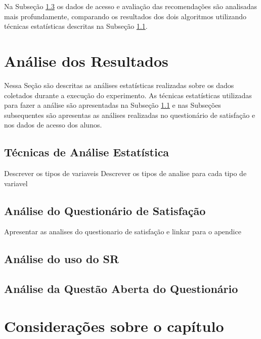 Na Subseção \ref{subsection:analise-uso-sr} os dados de acesso e avaliação das recomendações são analisadas mais profundamente,
comparando os resultados dos dois algoritmos utilizando técnicas estatísticas descritas na Subseção \ref{section:tecnicas-analise-estatistica}.

\section{Análise dos Resultados}\label{section:analise-experimento}

Nessa Seção são descritas as análises estatísticas realizadas sobre os dados coletados durante a execução do experimento.
As técnicas estatísticas utilizadas para fazer a análise são apresentadas na Subseção \ref{section:tecnicas-analise-estatistica}
e nas Subseções subsequentes são apresentas as análises realizadas no questionário de satisfação e nos dados de acesso
dos alunos.

\subsection{Técnicas de Análise Estatística}\label{section:tecnicas-analise-estatistica}

Descrever os tipos de variaveis
Descrever os tipos de analise para cada tipo de variavel


\subsection{Análise do Questionário de Satisfação}\label{subsection:analise-questionario-satisfacao}

Apresentar as analises do questionario de satisfação e linkar para o apendice

\subsection{Análise do uso do SR}\label{subsection:analise-uso-sr}

\subsection{Análise da Questão Aberta do Questionário}\label{subsection:analise-questao-aberta}

\section{Considerações sobre o capítulo}

